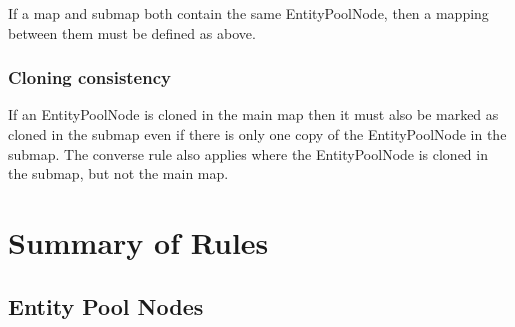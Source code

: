 If a map and submap both contain the same EntityPoolNode, then a
mapping between them must be defined as above.

\subsubsection{Cloning consistency}

If an EntityPoolNode is cloned in the main map then it must also be
marked as cloned in the submap even if there is only one copy of the
EntityPoolNode in the submap. The converse rule also applies where the
EntityPoolNode is cloned in the submap, but not the main map.

\section{Summary of Rules}

\subsection{Entity Pool Nodes}

